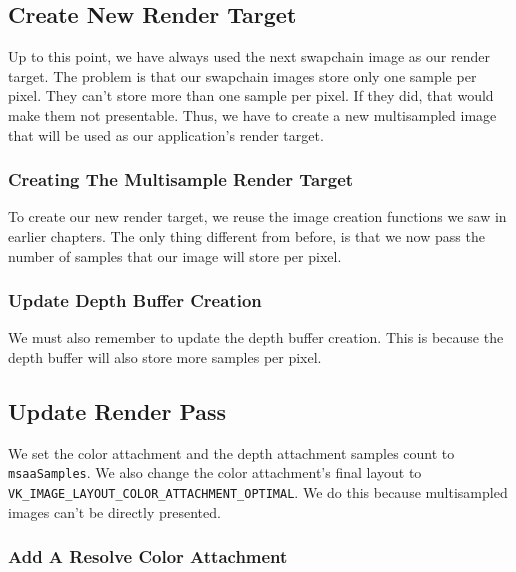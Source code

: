 \subsection{Create New Render Target}

Up to this point, we have always used the next swapchain image as our
render target.
The problem is that our swapchain images store only one sample per pixel.
They can't store more than one sample per pixel.
If they did, that would make them not presentable.
Thus, we have to create a new multisampled image that will be used
as our application's render target.

\subsubsection{Creating The Multisample Render Target}

To create our new render target, we reuse the image creation functions
we saw in earlier chapters.
The only thing different from before, is that we now pass the
number of samples that our image will store per pixel.

\begin{minipage}{\linewidth}{\noindent}
    
\end{minipage}

\subsubsection{Update Depth Buffer Creation}

We must also remember to update the depth buffer creation.
This is because the depth buffer will also store more samples per pixel.

\subsection{Update Render Pass}

We set the color attachment and the depth attachment samples count
to \texttt{msaaSamples}.
We also change the color attachment's final layout to
\texttt{VK\_IMAGE\_LAYOUT\_COLOR\_ATTACHMENT\_OPTIMAL}.
We do this because multisampled images can't be directly presented.

\subsubsection{Add A Resolve Color Attachment}


